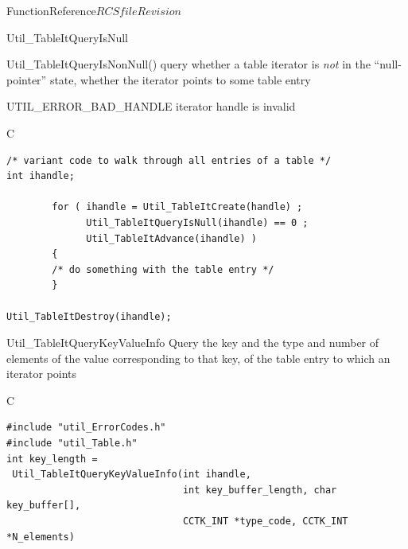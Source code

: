 \begin{cactuspart}{FunctionReference}{$RCSfile$}{$Revision$}
\begin{FunctionDescription}{Util\_TableItQueryIsNull}
\begin{SeeAlsoSection}
\begin{SeeAlso}{Util\_TableItQueryIsNonNull()}
query whether a table iterator is {\em not\/} in the ``null-pointer'' state,
\ie{} whether the iterator points to some table entry
\end{SeeAlso}
\end{SeeAlsoSection}

\begin{ErrorSection}
\begin{Error}{UTIL\_ERROR\_BAD\_HANDLE}
iterator handle is invalid
\end{Error}
\end{ErrorSection}

\begin{ExampleSection}
\begin{Example}{C}
\begin{verbatim}
/* variant code to walk through all entries of a table */
int ihandle;

        for ( ihandle = Util_TableItCreate(handle) ;
              Util_TableItQueryIsNull(ihandle) == 0 ;
              Util_TableItAdvance(ihandle) )
        {
        /* do something with the table entry */
        }

Util_TableItDestroy(ihandle);
\end{verbatim}
\end{Example}
\end{ExampleSection}
\end{FunctionDescription}


\begin{FunctionDescription}{Util\_TableItQueryKeyValueInfo}
\label{Util-TableItQueryKeyValueInfo}
Query the key and the type and number of elements of the value
corresponding to that key, of the table entry to which an iterator points

\begin{SynopsisSection}
\begin{Synopsis}{C}
\begin{verbatim}
#include "util_ErrorCodes.h"
#include "util_Table.h"
int key_length =
 Util_TableItQueryKeyValueInfo(int ihandle,
                               int key_buffer_length, char key_buffer[],
                               CCTK_INT *type_code, CCTK_INT *N_elements)
\end{verbatim}
\end{Synopsis}
\end{SynopsisSection}


\end{FunctionDescription}
\end{cactuspart}

